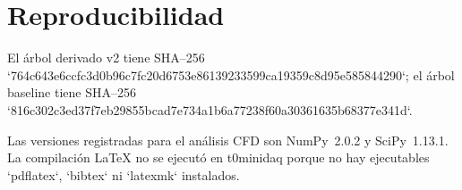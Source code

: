 \chapter{Reproducibilidad}
El árbol derivado v2 tiene SHA--256 `764c643e6ccfc3d0b96c7fc20d6753e86139233599ca19359c8d95e585844290`; el árbol baseline tiene SHA--256 `816c302c3ed37f7eb29855bcad7e734a1b6a77238f60a30361635b68377e341d`.

Las versiones registradas para el análisis CFD son NumPy~2.0.2 y SciPy~1.13.1. La compilación LaTeX no se ejecutó en t0minidaq porque no hay ejecutables `pdflatex`, `bibtex` ni `latexmk` instalados.
